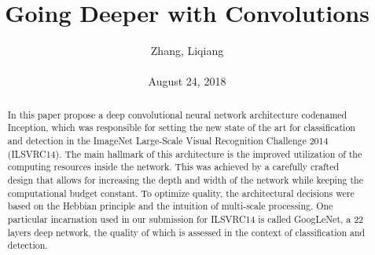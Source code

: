 \documentclass[10pt,twocolumn,letterpaper]{article}
\title{\textbf{Going Deeper with Convolutions}}
\author{Zhang, Liqiang\\\\August 24, 2018}
\begin{document}
\maketitle
\par
\begin{abstract}
In this paper propose a deep convolutional neural network architecture codenamed Inception, which was responsible for setting the new state of the art for classification and detection in the ImageNet Large-Scale Visual Recognition Challenge 2014 (ILSVRC14). The main hallmark of this architecture is the improved utilization of the computing resources inside the network. This was achieved by a carefully crafted design that allows for increasing the depth and width of the network while keeping the computational budget constant. To optimize quality, the architectural decisions were based on the Hebbian principle and the intuition of multi-scale processing. One particular incarnation used in our submission for ILSVRC14 is called GoogLeNet, a 22 layers deep network, the quality of which is assessed in the context of classification and detection.
\end{abstract}
\end{document}
